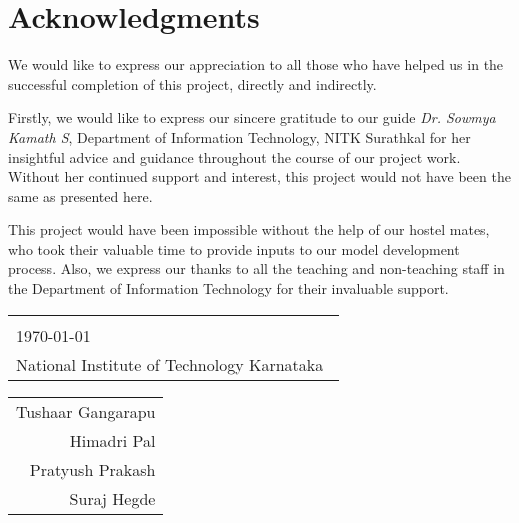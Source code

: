 \cleardoublepage
{}
{}
\chapter*{Acknowledgments}
We would like to express our appreciation to all those who have helped us in the successful completion of this project, directly and indirectly. \par
Firstly, we would like to express our sincere gratitude to our guide \textit{Dr. Sowmya Kamath S}, Department of Information Technology, NITK Surathkal for her insightful advice and guidance throughout the course of our project work. Without her continued support and interest, this project would not have been the same as presented here.\par
This project would have been impossible without the help of our hostel mates, who took their valuable time to provide inputs to our model development process. Also, we express our thanks to all the teaching and non-teaching staff in the Department of Information Technology for their invaluable support.

\vfill

\noindent
\begin{tabular}[t]{@{}l} 
\\
\\
\today \\
{National Institute of Technology Karnataka}\
\end{tabular}
\hfill%
\begin{tabular}[t]{r@{}}
Tushaar Gangarapu \\
Himadri Pal \\
Pratyush Prakash \\
Suraj Hegde
\end{tabular}